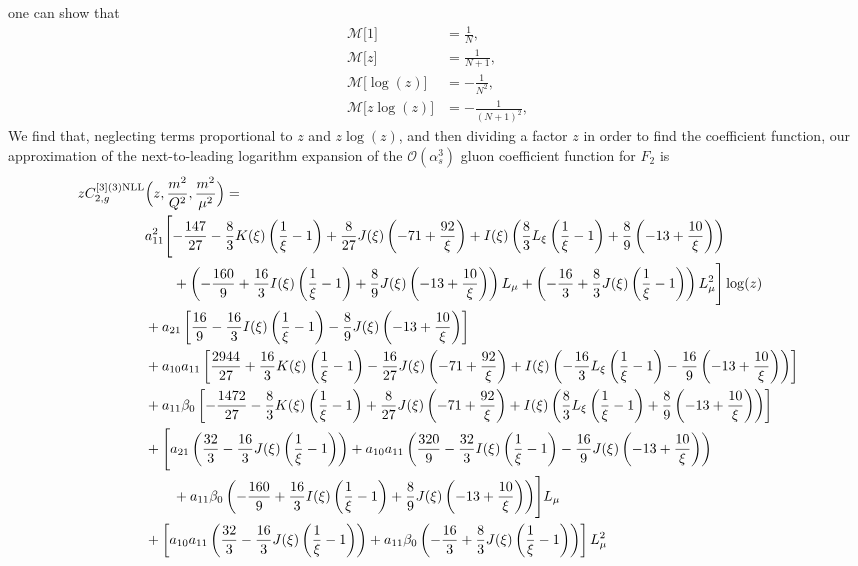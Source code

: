 \documentclass[a4paper]{article}
\newcommand{\ord}[1]{\mathcal{O} (\alpha_s^{#1})}
\begin{document}
one can show that
\begin{align}
	\mathcal{M}\bigl[1\bigr]&=\frac{1}{N}, \\
	\mathcal{M}\bigl[z\bigr]&=\frac{1}{N+1}, \\
	\mathcal{M}\bigl[\log(z)\bigr]&=-\frac{1}{N^2}, \\
	\mathcal{M}\bigl[z\log(z)\bigr]&=-\frac{1}{(N+1)^2},
\end{align}
We find that, neglecting terms proportional to $z$ and $z\log(z)$, and then dividing a factor $z$ in order to find the coefficient function, our approximation of the next-to-leading logarithm expansion of the $\ord{3}$ gluon coefficient function for $F_2$ is
\begin{equation}
	\begin{split}
		z C_{2,g}^{[3](3) \rm NLL}&\Bigl(z,\frac{m^2}{Q^2},\frac{m^2}{\mu^2}\Bigr)= \\
		& a_{11}^2\Biggl[-\frac{147}{27} - \frac{8}{3} K(\xi) \left(\frac{1}{\xi}-1\right) + \frac{8}{27} J(\xi) \left(-71 + \frac{92}{\xi}\right) + I(\xi) \left(\frac{8}{3} L_\xi \left(\frac{1}{\xi}-1\right) + \frac{8}{9} \left(-13 + \frac{10}{\xi}\right)\right) \\
		& \qquad + \left(-\frac{160}{9} + \frac{16}{3} I(\xi) \left(\frac{1}{\xi}-1\right) + \frac{8}{9} J(\xi) \left(-13 + \frac{10}{\xi}\right)\right) L_\mu + \left(-\frac{16}{3} + \frac{8}{3} J(\xi) \left(\frac{1}{\xi}-1\right)\right) L_\mu^2\Biggr] \log(z) \\
		& + a_{21} \left[\frac{16}{9} - \frac{16}{3} I(\xi) \left(\frac{1}{\xi}-1\right) - \frac{8}{9} J(\xi) \left(-13 + \frac{10}{\xi}\right)\right] \\
		& + a_{10} a_{11} \left[\frac{2944}{27} + \frac{16}{3} K(\xi) \left(\frac{1}{\xi}-1\right) - \frac{16}{27} J(\xi) \left(-71 + \frac{92}{\xi}\right) + I(\xi) \left(-\frac{16}{3} L_\xi \left(\frac{1}{\xi}-1\right) - \frac{16}{9} \left(-13 + \frac{10}{\xi}\right)\right)\right] \\
		& + a_{11} \beta_0 \left[-\frac{1472}{27} - \frac{8}{3} K(\xi) \left(\frac{1}{\xi}-1\right) + \frac{8}{27} J(\xi) \left(-71 + \frac{92}{\xi}\right) + I(\xi) \left(\frac{8}{3} L_\xi \left(\frac{1}{\xi}-1\right) + \frac{8}{9} \left(-13 + \frac{10}{\xi}\right)\right)\right] \\
		& + \Biggl[a_{21} \left(\frac{32}{3} - \frac{16}{3} J(\xi) \left(\frac{1}{\xi}-1\right) \right) + a_{10} a_{11} \left(\frac{320}{9} - \frac{32}{3} I(\xi) \left(\frac{1}{\xi}-1\right) - \frac{16}{9} J(\xi) \left(-13 + \frac{10}{\xi} \right)\right) \\
		& \qquad+ a_{11} \beta_0 \left(-\frac{160}{9} + \frac{16}{3} I(\xi) \left(\frac{1}{\xi}-1\right) + \frac{8}{9} J(\xi) \left(-13 + \frac{10}{\xi} \right)\right) \Biggr] L_\mu \\
		& + \left[ a_{10} a_{11} \left(\frac{32}{3} - \frac{16}{3} J(\xi) \left(\frac{1}{\xi}-1 \right)\right) + a_{11} \beta_0 \left(-\frac{16}{3} + \frac{8}{3} J(\xi) \left(\frac{1}{\xi}-1\right)\right)\right] L_\mu^2
	\end{split}
\end{equation}
\end{document}
